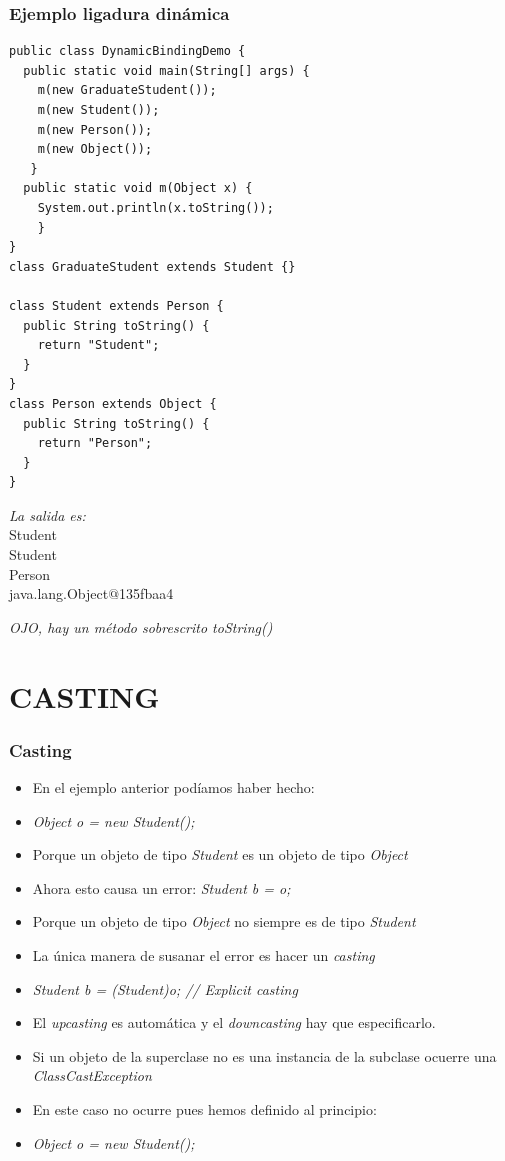 \documentclass{beamer}
\begin{document}
\begin{frame}[fragile]
\frametitle{Ejemplo ligadura dinámica}
\begin{multicols}{2}
\begin{tiny}
\begin{verbatim}
public class DynamicBindingDemo {
  public static void main(String[] args) {
    m(new GraduateStudent());
    m(new Student());
    m(new Person());
    m(new Object());
   }
  public static void m(Object x) {
    System.out.println(x.toString());
    }
}
class GraduateStudent extends Student {}

class Student extends Person {
  public String toString() {
    return "Student";
  }
}
class Person extends Object {
  public String toString() {
    return "Person";
  }
}
\end{verbatim}

\pause
\emph{La salida es:}\\
Student\\
Student\\
Person\\
java.lang.Object$@$135fbaa4\\
\end{tiny}
\emph{OJO, hay un método sobrescrito \emph{toString()}}
\end{multicols}
\end{frame}


\section{CASTING}
\begin{frame}
\frametitle{Casting}
\begin{itemize}[<+->]
\item En el ejemplo anterior podíamos haber hecho:
\item \emph{Object o = new Student();}
\item Porque un objeto de tipo \emph{Student} es un objeto de tipo \emph{Object}
\item Ahora esto causa un error: \emph{Student b = o;}
\item Porque un objeto de tipo \emph{Object} no siempre es de tipo \emph{Student}
\item La única manera de susanar el error es hacer un \emph{casting}
\item \emph{Student b = (Student)o; // Explicit casting}
\item El \emph{upcasting} es automática y el \emph{downcasting} hay que especificarlo.
\item Si un objeto de la superclase no es una instancia de la subclase ocuerre una \emph{ClassCastException}
\item En este caso no ocurre pues hemos definido al principio:
\item \emph{Object o = new Student();}
\end{itemize}
\end{frame}
\end{document}

